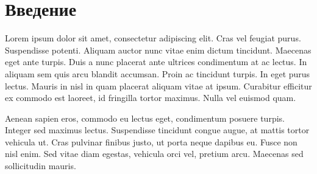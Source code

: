 \clearpage
\section{Введение}
Lorem ipsum dolor sit amet, consectetur adipiscing elit. Cras vel feugiat purus. Suspendisse potenti. Aliquam auctor nunc vitae enim dictum tincidunt. Maecenas eget ante turpis. Duis a nunc placerat ante ultrices condimentum at ac lectus. In aliquam sem quis arcu blandit accumsan. Proin ac tincidunt turpis. In eget purus lectus. Mauris in nisl in quam placerat aliquam vitae at ipsum. Curabitur efficitur ex commodo est laoreet, id fringilla tortor maximus. Nulla vel euismod quam.
\par
Aenean sapien eros, commodo eu lectus eget, condimentum posuere turpis. Integer sed maximus lectus. Suspendisse tincidunt congue augue, at mattis tortor vehicula ut. Cras pulvinar finibus justo, ut porta neque dapibus eu. Fusce non nisl enim. Sed vitae diam egestas, vehicula orci vel, pretium arcu. Maecenas sed sollicitudin mauris.
